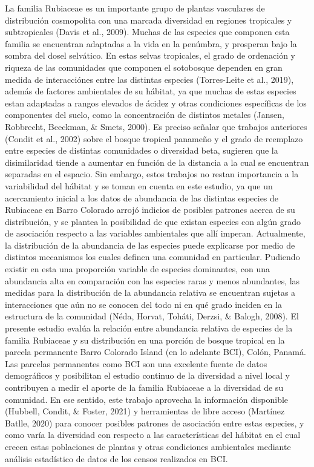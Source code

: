 \documentclass[11pt,]{article}
\begin{document}
La familia Rubiaceae es un importante grupo de plantas vasculares de
distribución cosmopolita con una marcada diversidad en regiones
tropicales y subtropicales (Davis et al., 2009). Muchas de las especies
que componen esta familia se encuentran adaptadas a la vida en la
penúmbra, y prosperan bajo la sombra del dosel selvático. En estas
selvas tropicales, el grado de ordenación y riqueza de las comunidades
que componen el sotobosque dependen en gran medida de interacciónes
entre las distintas especies (Torres-Leite et al., 2019), además de
factores ambientales de su hábitat, ya que muchas de estas especies
estan adaptadas a rangos elevados de ácidez y otras condiciones
específicas de los componentes del suelo, como la concentración de
distintos metales (Jansen, Robbrecht, Beeckman, \& Smets, 2000). Es
preciso señalar que trabajos anteriores (Condit et al., 2002) sobre el
bosque tropical panameño y el grado de reemplazo entre especies de
distintas comunidades o diversidad beta, sugieren que la disimilaridad
tiende a aumentar en función de la distancia a la cual se encuentran
separadas en el espacio. Sin embargo, estos trabajos no restan
importancia a la variabilidad del hábitat y se toman en cuenta en este
estudio, ya que un acercamiento inicial a los datos de abundancia de las
distintas especies de Rubiaceae en Barro Colorado arrojó indicios de
posibles patrones acerca de su distribución, y se plantea la posibilidad
de que existan especies con algún grado de asociación respecto a las
variables ambientales que allí imperan. Actualmente, la distribución de
la abundancia de las especies puede explicarse por medio de distintos
mecanismos los cuales definen una comunidad en particular. Pudiendo
existir en esta una proporción variable de especies dominantes, con una
abundancia alta en comparación con las especies raras y menos
abundantes, las medidas para la distribución de la abundancia relativa
se encuentran sujetas a interacciones que aún no se conocen del todo ni
en qué grado inciden en la estructura de la comunidad (Néda, Horvat,
Toháti, Derzsi, \& Balogh, 2008). El presente estudio evalúa la relación
entre abundancia relativa de especies de la familia Rubiaceae y su
distribución en una porción de bosque tropical en la parcela permanente
Barro Colorado Island (en lo adelante BCI), Colón, Panamá. Las parcelas
permanentes como BCI son una excelente fuente de datos demográficos y
posibilitan el estudio continuo de la diversidad a nivel local y
contribuyen a medir el aporte de la familia Rubiaceae a la diversidad de
su comunidad. En ese sentido, este trabajo aprovecha la información
disponible (Hubbell, Condit, \& Foster, 2021) y herramientas de libre
acceso (Martínez Batlle, 2020) para conocer posibles patrones de
asociación entre estas especies, y como varía la diversidad con respecto
a las características del hábitat en el cual crecen estas poblaciones de
plantas y otras condiciones ambientales mediante análisis estadístico de
datos de los censos realizados en BCI.
\end{document}
